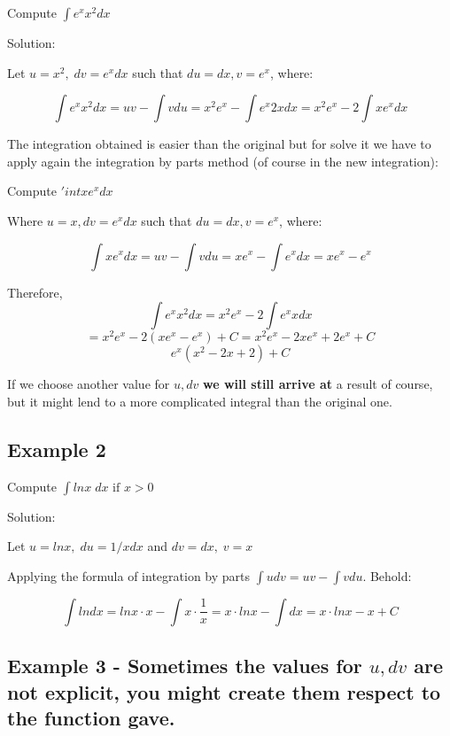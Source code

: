 \documentclass{article}
\begin{document}
Compute \(\int e^x x^2 dx\)

Solution:

Let \(u = x^2,\; dv=e^x dx\) such that \(du = dx, v = e^x\), where:

\[\int e^x x^2 dx = uv - \int vdu = x^2 e^x - \int e^x 2x dx = x^2e^x - 2 \int x e^x dx\]

The integration obtained is easier than the original but for solve it we have to apply again the integration by parts method (of course in the new integration):

Compute \('int x e^x dx\)

Where \(u =x, dv = e^x dx\) such that \(du = dx, v=e^x\), where:

\[\int x e^x dx = uv - \int vdu = xe^x - \int e^x dx = xe^x - e^x\]

Therefore,
\[\int e^x x^2 dx = x^2 e^x - 2 \int e^x x dx\]
\[= x^2 e^x -2 (x e^x - e^x) + C = x^2 e^x -2xe^x + 2 e^x + C\]
\[e^x (x^2-2x+2) + C\]

If we choose  another value for \(u, dv\) \textbf{we will still arrive at} a result of course, but it might lend to a more complicated integral than the original one.

\subsection{Example 2}

Compute \(\int ln x \;dx \text{ if } x>0\)

Solution:

Let \(u = lnx,\;du = 1/x dx\) and \(dv = dx,\;v=x\)

Applying the formula of integration by parts \(\int udv = uv - \int vdu\). Behold:

\[\int lndx = lnx\cdot x - \int x\cdot \frac{1}{x} = x\cdot lnx-\int dx = x \cdot lnx -x +C\]

\subsection{Example 3 - Sometimes the values for \(u, dv\) are not explicit, you might create them respect to the function gave.}
\end{document}
